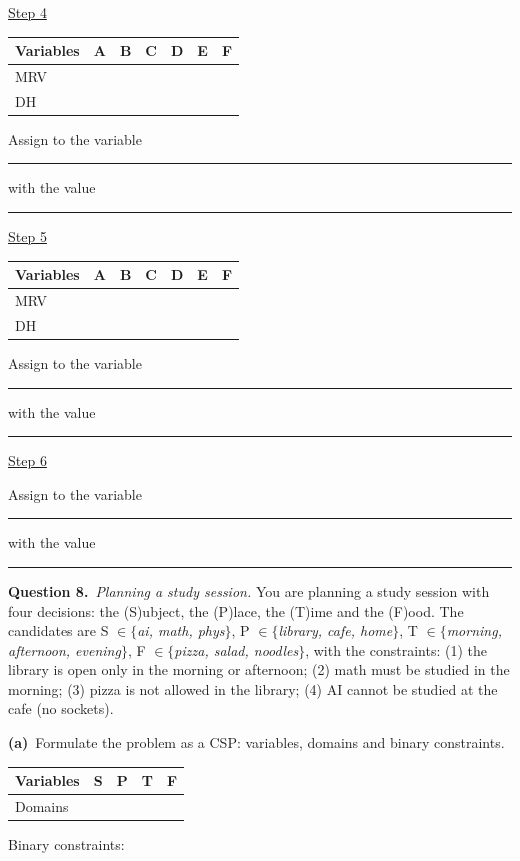 \documentclass[11pt,a4paper]{article}
\newcommand{\question}[1]{\par\medskip\noindent\textbf{Question #1.}\ }
\newcommand{\subq}[1]{\par\smallskip\noindent\textbf{#1}\ }
\begin{document}
\underline{Step 4}\par\begin{center}\small \begin{tabular}{|l|c|c|c|c|c|c|}\hline Variables & \textbf{A} & \textbf{B} & \textbf{C} & \textbf{D} & \textbf{E} & \textbf{F}\\ \hline MRV & \phantom{0} & \phantom{0} & \phantom{0} & \phantom{0} & \phantom{0} & \phantom{0}\\[1mm]\hline DH & \phantom{0} & \phantom{0} & \phantom{0} & \phantom{0} & \phantom{0} & \phantom{0}\\[1mm]\hline\end{tabular}\end{center}Assign to the variable \rule{2.5cm}{0.3pt} with the value \rule{2.5cm}{0.3pt}\par
\underline{Step 5}\par\begin{center}\small \begin{tabular}{|l|c|c|c|c|c|c|}\hline Variables & \textbf{A} & \textbf{B} & \textbf{C} & \textbf{D} & \textbf{E} & \textbf{F}\\ \hline MRV & \phantom{0} & \phantom{0} & \phantom{0} & \phantom{0} & \phantom{0} & \phantom{0}\\[1mm]\hline DH & \phantom{0} & \phantom{0} & \phantom{0} & \phantom{0} & \phantom{0} & \phantom{0}\\[1mm]\hline\end{tabular}\end{center}Assign to the variable \rule{2.5cm}{0.3pt} with the value \rule{2.5cm}{0.3pt}\par
\underline{Step 6}\par Assign to the variable \rule{2.5cm}{0.3pt} with the value \rule{2.5cm}{0.3pt}\par
\clearpage
\question{8}\textit{Planning a study session.} You are planning a study session with four decisions: the (S)ubject, the (P)lace, the (T)ime and the (F)ood. The candidates are S $\in\{$\emph{ai, math, phys}$\}$, P $\in\{$\emph{library, cafe, home}$\}$, T $\in\{$\emph{morning, afternoon, evening}$\}$, F $\in\{$\emph{pizza, salad, noodles}$\}$, with the constraints: (1) the library is open only in the morning or afternoon; (2) math must be studied in the morning; (3) pizza is not allowed in the library; (4) AI cannot be studied at the cafe (no sockets).
\subq{(a)}Formulate the problem as a CSP: variables, domains and binary constraints.
\begin{center}\small\begin{tabular}{|l|c|c|c|c|}\hline Variables & \textbf{S} & \textbf{P} & \textbf{T} & \textbf{F}\\ \hline Domains &  &  &  & \\ \hline\end{tabular}\end{center}Binary constraints:\begin{ansbox}[height=1.2cm]\end{ansbox}
\end{document}
